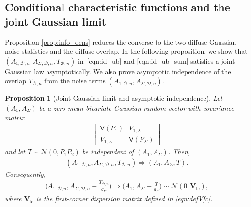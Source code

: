 \documentclass[11pt,onecolumn]{IEEEtran}
\newcommand{\calD}{\mathcal{D}}
\newcommand{\calN}{\mathcal{N}}
\newcommand{\bV}{\mathbf{V}}
\newcommand{\rvV}{\mathsf{V}}
\newtheorem{proposition}[theorem]{Proposition}
\begin{document}
\subsection{Conditional characteristic functions and the joint Gaussian limit} \label{sec:char_functions}
Proposition \ref{prop:info_dens} reduces the converse to the two diffuse Gaussian-noise statistics and the diffuse overlap. In the following proposition, we show that $(A_{1,\calD,n }, A_{\Sigma,\calD,n },T_{\calD,n})$  in~\eqref{eqn:id_ub} and \eqref{eqn:id_ub_sum} satisfies a joint Gaussian law asymptotically. We also prove asymptotic independence of the overlap $T_{\calD,n}$ from the noise terms $(A_{1,\calD,n }, A_{\Sigma,\calD,n })$.
\begin{proposition}[Joint Gaussian limit and asymptotic independence] \label{prop:clt}
    Let $(A_1, A_\Sigma)$ be a zero-mean bivariate Gaussian random vector with covariance matrix 
    \begin{align}
        \begin{bmatrix}
        \rvV(P_1) & V_{1,\Sigma}\\
V_{1,\Sigma} & \rvV(P_\Sigma) 
    \end{bmatrix} \label{eqn:Vcov}
    \end{align}
    and let $T\sim\calN(0,P_1P_2)$ be independent of $(A_1, A_\Sigma)$. Then, 
    \begin{align}
        (A_{1,\calD,n }, A_{\Sigma,\calD,n },T_{\calD,n})\Rightarrow(A_1, A_\Sigma, T). \label{eqn:AAT_conv}
    \end{align}
    Consequently, 
    \begin{align}
        \bigg( A_{1,\calD,n }, A_{\Sigma,\calD,n }+\frac{T_{\calD,n}}{q_\Sigma}\bigg)\Rightarrow \bigg(A_1, A_\Sigma+\frac{T}{q_\Sigma} \bigg)\sim\calN(0, \bV_{\mathrm{fc}}), \label{eqn:proof_fc}
    \end{align}
    where $\bV_{\mathrm{fc}}$ is the first-corner  dispersion matrix defined in \eqref{eqn:defVfc}.
\end{proposition}
\end{document}
